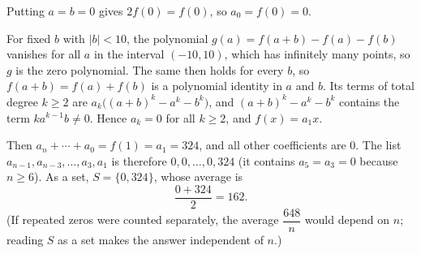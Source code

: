 Putting $a=b=0$ gives $2f(0)=f(0)$, so $a_0=f(0)=0$.

For fixed $b$ with $|b|<10$, the polynomial $g(a)=f(a+b)-f(a)-f(b)$ vanishes for all $a$ in the interval $(-10,10)$, which has infinitely many points, so $g$ is the zero polynomial. The same then holds for every $b$, so $f(a+b)=f(a)+f(b)$ is a polynomial identity in $a$ and $b$. Its terms of total degree $k\ge2$ are $a_k\bigl((a+b)^k-a^k-b^k\bigr)$, and $(a+b)^k-a^k-b^k$ contains the term $ka^{k-1}b\ne0$. Hence $a_k=0$ for all $k\ge2$, and $f(x)=a_1x$.

Then $a_n+\cdots+a_0=f(1)=a_1=324$, and all other coefficients are $0$. The list $a_{n-1},a_{n-3},\dots,a_3,a_1$ is therefore $0,0,\dots,0,324$ (it contains $a_5=a_3=0$ because $n\ge6$). As a set, $S=\{0,324\}$, whose average is
\[
\dfrac{0+324}{2}=\boxed{162}.
\]
(If repeated zeros were counted separately, the average $\dfrac{648}{n}$ would depend on $n$; reading $S$ as a set makes the answer independent of $n$.)
